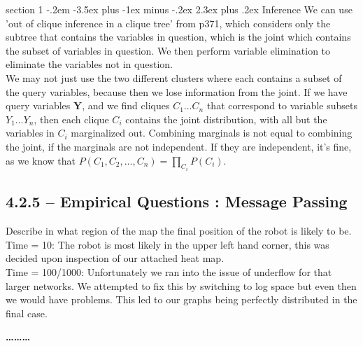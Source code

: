 \documentclass[12pt]{article}
\makeatletter
\newenvironment{problem}{\@startsection
       {section}
       {1}
       {-.2em}
       {-3.5ex plus -1ex minus -.2ex}
       {2.3ex plus .2ex}
       {\pagebreak[3]%
       \large\bf\noindent{Problem }
       }
       }
       {%
       \begin{center}\large\bf \ldots\ldots\ldots\end{center}}
\makeatother
\begin{document}
\begin{problem}{Inference}
We can use 'out of clique inference in a clique tree' from p371, which considers only the subtree that contains the variables in question, which is the joint which contains the subset of variables in question.  We then perform variable elimination to eliminate the variables not in question.\\
We may not just use the two different clusters where each contains a subset of the query variables, because then we lose information from the joint.  If we have query variables $\textbf{Y}$, and we find cliques $C_1 \ldots C_n$ that correspond to variable subsets $Y_1 \ldots Y_n$, then each clique $C_i$ contains the joint distribution, with all but the variables in $C_i$ marginalized out.  Combining marginals is not equal to combining the joint, if the marginals are not independent.  If they are independent, it's fine, as we know that $P(C_1,C_2,\ldots,C_n) = \prod_{C_i} P(C_i)$.\\

\subsection*{4.2.5 -- Empirical Questions : Message Passing}

Describe in what region of the map the final position of the robot is likely to be.\\
Time = 10: The robot is most likely in the upper left hand corner, this was decided upon inspection of our attached heat map.\\
Time = 100/1000: Unfortunately we ran into the issue of underflow for that larger networks. We attempted to fix this by switching to log space but even then we would have problems. This led to our graphs being perfectly distributed in the final case.\\


\end{problem}
\end{document}
